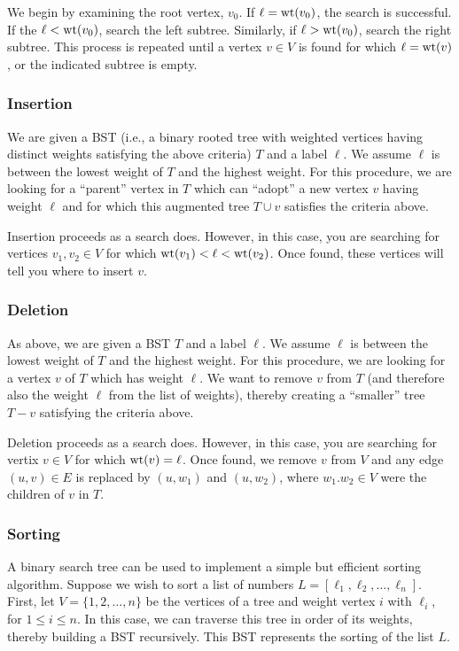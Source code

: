 We begin by examining the root vertex, $v_0$. If $\ell={\rm wt}(v_0)$,
the search is successful. If the $\ell<{\rm wt}(v_0)$,
search the left subtree. Similarly, if $\ell>{\rm wt}(v_0)$,
search the right subtree. This process is repeated until a vertex
$v\in V$ is found for which $\ell={\rm wt}(v)$,
or the indicated subtree is empty.


\subsubsection{Insertion}

We are given a BST (i.e., a binary rooted tree with weighted vertices
having distinct weights satisfying the above criteria) $T$ and a
label $\ell$. We assume $\ell$ is between the
lowest weight of $T$ and the highest weight.
For this procedure, we are looking for a ``parent''
vertex in $T$ which can ``adopt'' a new vertex $v$ having weight $\ell$
and for which this augmented tree $T\cup v$ satisfies
the criteria above.

Insertion proceeds as a search does. However, in this case, you are
searching for vertices $v_1,v_2\in V$ for which
${\rm wt}(v_1)<\ell < {\rm wt}(v_2)$. Once found, these
vertices will tell you where to insert $v$.

\subsubsection{Deletion}

As above, we are given a BST $T$ and a
label $\ell$. We assume $\ell$ is between the
lowest weight of $T$ and the highest weight.
For this procedure, we are looking for a vertex $v$ of
$T$ which has weight $\ell$. We want to remove $v$ from
$T$ (and therefore also the weight $\ell$ from the list of weights),
thereby creating a ``smaller'' tree $T- v$ satisfying
the criteria above.

Deletion proceeds as a search does. However, in this case, you are
searching for vertix $v\in V$ for which
${\rm wt}(v)=\ell$. Once found, we remove $v$ from $V$
and any edge $(u,v)\in E$ is replaced by $(u,w_1)$
and $(u,w_2)$, where $w_1.w_2\in V$ were the children of $v$
in $T$.

\subsubsection{Sorting}

A binary search tree can be used to implement a simple but efficient
sorting algorithm. Suppose we wish to sort a list of numbers
$L = [\ell_1, \ell_2,\dots, \ell_n]$. First, let $V=\{1,2,\dots,n\}$
be the vertices of a tree and weight vertex $i$ with $\ell_i$,
for $1\leq i\leq n$. In this case, we can traverse this tree
in order of its weights, thereby building a BST recursively.
This BST represents the sorting of the list $L$.
